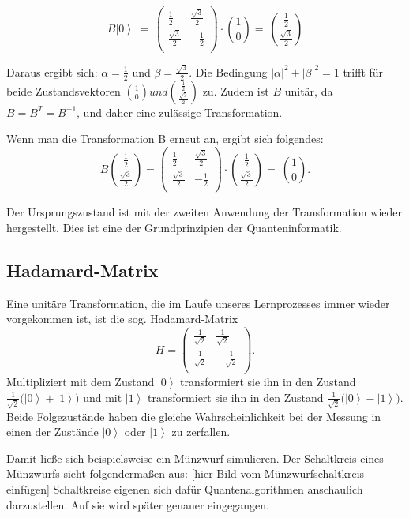 $$B\left|\left.0\right\rangle\ =\ \right.\left(\begin{matrix}\frac{1}{2}&\frac{\sqrt3}{2}\\\frac{\sqrt3}{2}&-\frac{1}{2}\\\end{matrix}\right)\cdot\binom{1}{0}=\ \binom{\frac{1}{2}}{\frac{\sqrt3}{2}}$$

Daraus ergibt sich: $\alpha=\frac{1}{2}$ und $\beta=\frac{\sqrt3}{2}$. Die Bedingung $\left|\alpha\right|^2+\left|\beta\right|^2=1$ trifft für beide Zustandsvektoren $\binom{1}{0} und \binom{\frac{1}{2}}{\frac{\sqrt3}{2}}$ zu. Zudem ist $B$ unitär, da $B=B^T= B^{-1}$, und daher eine zulässige Transformation.

Wenn man die Transformation B erneut an, ergibt sich folgendes:
$$B\binom{\frac{1}{2}}{\frac{\sqrt3}{2}}=\left(\begin{matrix}\frac{1}{2}&\frac{\sqrt3}{2}\\\frac{\sqrt3}{2}&-\frac{1}{2}\\\end{matrix}\right)\cdot\binom{\frac{1}{2}}{\frac{\sqrt3}{2}}=\ \binom{1}{0}.$$

Der Ursprungszustand ist mit der zweiten Anwendung der Transformation wieder hergestellt. Dies ist eine der Grundprinzipien der Quanteninformatik.

\subsection{Hadamard-Matrix}

Eine unitäre Transformation, die im Laufe unseres Lernprozesses immer wieder vorgekommen ist, ist die sog. Hadamard-Matrix $$H=\left(\begin{matrix}\frac{1}{\sqrt2}&\frac{1}{\sqrt2}\\\frac{1}{\sqrt2}&-\frac{1}{\sqrt2}\\\end{matrix}\right).$$ Multipliziert mit dem Zustand $\left|0\right\rangle$ transformiert sie ihn in den Zustand $\frac{1}{\sqrt2}(\left|\left.0\right\rangle+\right.\left|\left.1\right\rangle)\right.$ und mit $\left|1\right\rangle$ transformiert sie ihn in den Zustand $\frac{1}{\sqrt2}(\left|\left.0\right\rangle-\right.\left|\left.1\right\rangle)\right.$. Beide Folgezustände haben die gleiche Wahrscheinlichkeit bei der Messung in einen der Zustände $\left|0\right\rangle$ oder $\left|1\right\rangle$ zu zerfallen.

Damit ließe sich beispielsweise ein Münzwurf simulieren. Der Schaltkreis eines Münzwurfs sieht folgendermaßen aus: [hier Bild vom Münzwurfschaltkreis einfügen] Schaltkreise eigenen sich dafür Quantenalgorithmen anschaulich darzustellen. Auf sie wird später genauer eingegangen.

